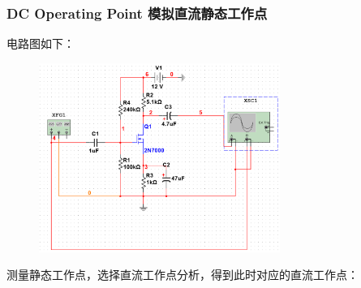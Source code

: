 \documentclass[a4paper,11pt,UTF8]{article}
\numberwithin{equation}{subsection}
\begin{document}
\subsubsection{DC Operating Point 模拟直流静态工作点}
电路图如下：
\begin{figure}[H]
	\centering
	\includegraphics[width=0.7\textwidth]{2.4.PNG}	
\end{figure}
测量静态工作点，选择直流工作点分析，得到此时对应的直流工作点：
\begin{figure}[H]

\end{figure}
\end{document}
